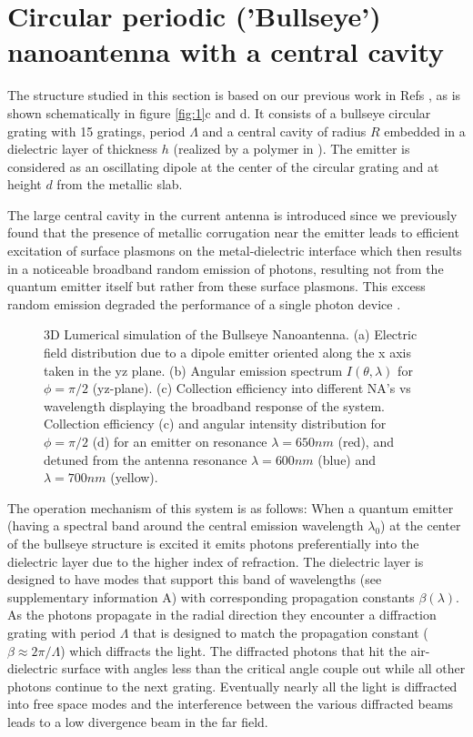 \documentclass[10pt,onecolumn ]{article}
\begin{document}
\section{Circular periodic ('Bullseye') nanoantenna with a central cavity}
The structure studied in this section is based on our previous work in Refs \cite{Livneh2016,Harats2017DesignEmission}, as is shown schematically in figure \ref{fig:1}c and d. 
It consists of a bullseye circular grating with 15 gratings,  period $\Lambda$ and a central cavity of radius $R$ embedded in a dielectric layer of thickness $h$ (realized by a polymer in \cite{Livneh2016,Harats2017DesignEmission}). The emitter is considered as an oscillating dipole at the center of the circular grating and at height $d$ from the metallic slab. 

The large central cavity in the current antenna is introduced since we previously found that the presence of metallic corrugation near the emitter leads to efficient excitation of surface plasmons on the metal-dielectric interface which then results in a noticeable broadband random  emission of photons, resulting not from the quantum emitter itself but rather from these surface plasmons. This excess random emission degraded the performance of a single photon device \cite{Livneh2016}. 

\begin{figure}[t!]
\caption{ 3D Lumerical\textsuperscript{\textregistered} simulation of the Bullseye Nanoantenna. (a) Electric field distribution due to a dipole emitter oriented along the x axis taken in the yz plane. (b) Angular emission spectrum $I(\theta,\lambda)$  for $\phi=\pi/2$  (yz-plane). (c) Collection efficiency into different NA's  vs wavelength displaying the broadband response of the system. Collection efficiency (c) and angular intensity distribution for $\phi=\pi/2$ (d) for an emitter on resonance $\lambda = 650 nm$ (red), and detuned from the antenna resonance $\lambda = 600 nm$ (blue) and $\lambda = 700 nm$ (yellow).  }
\label{fig:2}
\end{figure}
The operation mechanism of this system is as follows: When a quantum emitter (having a spectral band around the central emission wavelength $\lambda_0$) at the center of the bullseye structure is excited it emits photons preferentially into the dielectric layer due to the higher index of refraction. 
The dielectric layer is designed to have modes that support this band of wavelengths (see supplementary information A) with corresponding propagation constants $\beta(\lambda)$. 
As the photons propagate in the radial direction they encounter a diffraction grating with period $\Lambda$ that is designed to match the propagation constant ($\beta \approx 2\pi/\Lambda$) which diffracts the light.
The diffracted photons that hit the air-dielectric surface with angles less than the critical angle couple out while all other photons continue to the next grating. 
Eventually nearly all the light is diffracted into free space modes and the interference between the various diffracted beams leads to a low divergence beam in the far field. 
\end{document}
